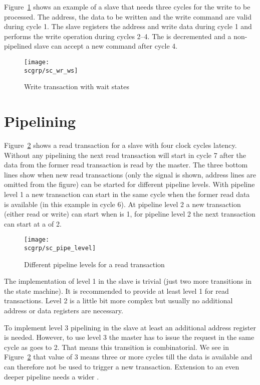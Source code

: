 Figure~\ref{fig:sc:wr:ws} shows an example of a slave that needs
three cycles for the write to be processed. The address, the data to
be written and the write command are valid during cycle 1. The slave
registers the address and write data during cycle 1 and performs the
write operation during cycles 2--4. The  is
decremented and a non-pipelined slave can accept a new command after
cycle 4.

\begin{figure}
    \centering
    \texttt{[image: \\scgrp/sc\_wr\_ws]}
    \caption{Write transaction with wait states}
    \label{fig:sc:wr:ws}
\end{figure}



\section{Pipelining}

Figure~\ref{fig:sc:pipe:level} shows a read transaction for a slave
with four clock cycles latency. Without any pipelining the next read
transaction will start in cycle 7 after the data from the former
read transaction is read by the master. The three bottom lines show
when new read transactions (only the  signal is shown,
address lines are omitted from the figure) can be started for
different pipeline levels. With pipeline level 1 a new transaction
can start in the same cycle when the former read data is available
(in this example in cycle 6). At pipeline level 2 a new transaction
(either read or write) can start when  is 1, for
pipeline level 2 the next transaction can start at a 
of 2.

\begin{figure}
    \centering
    \texttt{[image: \\scgrp/sc\_pipe\_level]}
    \caption{Different pipeline levels for a read transaction}
    \label{fig:sc:pipe:level}
\end{figure}

The implementation of level 1 in the slave is trivial (just two more
transitions in the state machine). It is recommended to provide  at
least level 1 for read transactions. Level 2 is a little bit more
complex but usually no additional address or data registers are
necessary.

To implement level 3 pipelining in the slave at least an additional
address register is needed. However, to use level 3 the master has
to issue the request in the same cycle as  goes to 2.
That means this transition is combinatorial. We see in
Figure~\ref{fig:sc:pipe:level} that  value of 3 means
three or more cycles till the data is available and can therefore
not be used to trigger a new transaction. Extension to an even
deeper pipeline needs a wider .


